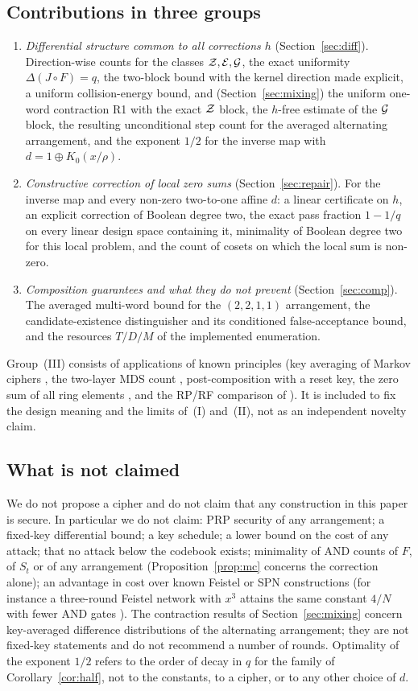 \subsection{Contributions in three groups}
\begin{enumerate}
\item[(I)] \emph{Differential structure common to all corrections $h$} (Section~\ref{sec:diff}).
Direction-wise counts for the classes $\mathcal{Z},\mathcal{E},\mathcal{G}$, the exact uniformity $\Delta(J\circ F)=q$,
the two-block bound with the kernel direction made explicit, a uniform collision-energy bound, and
(Section~\ref{sec:mixing}) the uniform one-word contraction R1 with the exact $\mathcal{Z}$ block, the $h$-free estimate of the $\mathcal{G}$
block, the resulting unconditional step count for the averaged alternating arrangement, and the exponent $1/2$ for the
inverse map with $d=1\oplus K_0(x/\rho)$.
\item[(II)] \emph{Constructive correction of local zero sums} (Section~\ref{sec:repair}).
For the inverse map and every non-zero two-to-one affine $d$: a linear certificate on $h$, an explicit correction of Boolean
degree two, the exact pass fraction $1-1/q$ on every linear design space containing it, minimality of
Boolean degree two for this local problem, and the count of cosets on which the local sum is non-zero.
\item[(III)] \emph{Composition guarantees and what they do not prevent} (Section~\ref{sec:comp}).
The averaged multi-word bound for the $(2,2,1,1)$ arrangement, the candidate-existence distinguisher
and its conditioned false-acceptance bound, and the resources $T/D/M$ of the implemented
enumeration.
\end{enumerate}
Group~(III) consists of applications of known principles (key averaging of Markov ciphers
\cite{LMM}, the two-layer MDS count \cite{Hong,Park}, post-composition with a reset key, the zero
sum of all ring elements \cite{KW}, and the RP/RF comparison of \cite{Bernstein}). It is included to
fix the design meaning and the limits of~(I) and~(II), not as an independent novelty claim.

\subsection{What is not claimed}
We do not propose a cipher and do not claim that any construction in this paper is secure.
In particular we do not claim: PRP security of any arrangement; a fixed-key differential bound;
a key schedule; a lower bound on the cost of any attack; that no attack below the codebook exists;
minimality of AND counts of $F$, of $S_t$ or of any arrangement (Proposition~\ref{prop:mc} concerns the correction alone); an advantage in cost over known Feistel or SPN
constructions (for instance a three-round Feistel network with $x^3$ attains the same constant
$4/N$ with fewer AND gates \cite{AO}). The contraction results of Section~\ref{sec:mixing} concern key-averaged difference distributions of the
alternating arrangement; they are not fixed-key statements and do not recommend a number of rounds. Optimality of the exponent
$1/2$ refers to the order of decay in $q$ for the family of Corollary~\ref{cor:half}, not to the constants, to a cipher, or to any other choice of $d$.

